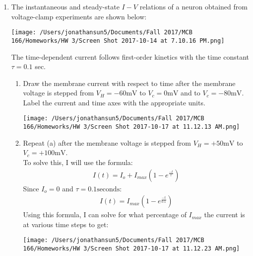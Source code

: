 \documentclass[11pt]{article}
\begin{document}
\begin{enumerate}[label=\arabic*.]
\newpage
\item
The instantaneous and steady-state $I-V$ relations of a neuron obtained from voltage-clamp experiments are shown below:
\begin{center}
\texttt{[image: /Users/jonathansun5/Documents/Fall 2017/MCB 166/Homeworks/HW 3/Screen Shot 2017-10-14 at 7.10.16 PM.png]}
\end{center}
The time-dependent current follows first-order kinetics with the time constant $\tau = 0.1$ sec.
\begin{enumerate}[label=(\alph*)]
\item
Draw the membrane current with respect to time after the membrane voltage is stepped from $V_H = -60 \text{mV}$ to $V_c = 0 \text{mV}$ and to $V_c = -80 \text{mV}$. Label the current and time axes with the appropriate units.
\begin{center}
\texttt{[image: /Users/jonathansun5/Documents/Fall 2017/MCB 166/Homeworks/HW 3/Screen Shot 2017-10-17 at 11.12.13 AM.png]}
\end{center}



\item
Repeat (a) after the membrane voltage is stepped from $V_H = +50 \text{mV}$ to $V_c = +100 \text{mV}$.
\vspace*{1\baselineskip}
\\
To solve this, I will use the formula:
\begin{align*}
I(t) = I_o + I_{max}\left(1 - e ^ {\frac{-t} {\tau}}\right)
\end{align*}
Since $I_o = 0$ and $\tau = 0.1 \text{seconds}$:
\begin{align*}
I(t) = I_{max}\left(1 - e ^ {\frac{-t} {0.1}}\right)
\end{align*}
Using this formula, I can solve for what percentage of $I_{max}$ the current is at various time steps to get:
\begin{center}
\texttt{[image: /Users/jonathansun5/Documents/Fall 2017/MCB 166/Homeworks/HW 3/Screen Shot 2017-10-17 at 11.12.23 AM.png]}
\end{center}
\end{enumerate}




\end{enumerate}
\end{document}
